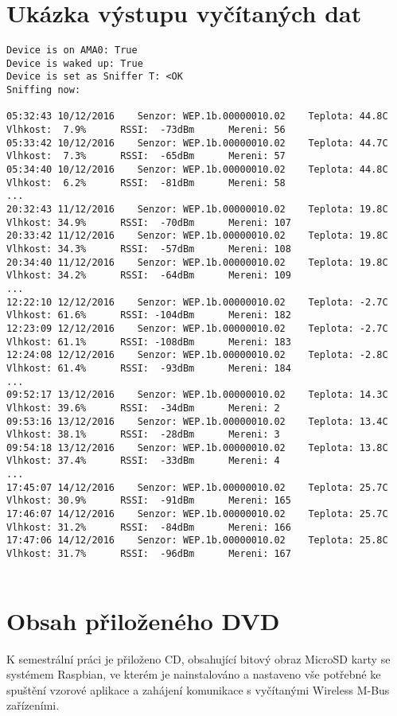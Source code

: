\chapter{Ukázka výstupu vyčítaných dat}
\label{PrilohaVystup}
	\begin{lstlisting}[style=MyCodeBash]
Device is on AMA0: True
Device is waked up: True
Device is set as Sniffer T: <OK
Sniffing now:

05:32:43 10/12/2016    Senzor: WEP.1b.00000010.02    Teplota: 44.8C    Vlhkost:  7.9%      RSSI:  -73dBm      Mereni: 56
05:33:42 10/12/2016    Senzor: WEP.1b.00000010.02    Teplota: 44.7C    Vlhkost:  7.3%      RSSI:  -65dBm      Mereni: 57
05:34:40 10/12/2016    Senzor: WEP.1b.00000010.02    Teplota: 44.8C    Vlhkost:  6.2%      RSSI:  -81dBm      Mereni: 58
...
20:32:43 11/12/2016    Senzor: WEP.1b.00000010.02    Teplota: 19.8C    Vlhkost: 34.9%      RSSI:  -70dBm      Mereni: 107
20:33:42 11/12/2016    Senzor: WEP.1b.00000010.02    Teplota: 19.8C    Vlhkost: 34.3%      RSSI:  -57dBm      Mereni: 108
20:34:40 11/12/2016    Senzor: WEP.1b.00000010.02    Teplota: 19.8C    Vlhkost: 34.2%      RSSI:  -64dBm      Mereni: 109
...
12:22:10 12/12/2016    Senzor: WEP.1b.00000010.02    Teplota: -2.7C    Vlhkost: 61.6%      RSSI: -104dBm      Mereni: 182
12:23:09 12/12/2016    Senzor: WEP.1b.00000010.02    Teplota: -2.7C    Vlhkost: 61.1%      RSSI: -108dBm      Mereni: 183 
12:24:08 12/12/2016    Senzor: WEP.1b.00000010.02    Teplota: -2.8C    Vlhkost: 61.4%      RSSI:  -93dBm      Mereni: 184
...
09:52:17 13/12/2016    Senzor: WEP.1b.00000010.02    Teplota: 14.3C    Vlhkost: 39.6%      RSSI:  -34dBm      Mereni: 2
09:53:16 13/12/2016    Senzor: WEP.1b.00000010.02    Teplota: 13.4C    Vlhkost: 38.1%      RSSI:  -28dBm      Mereni: 3 
09:54:18 13/12/2016    Senzor: WEP.1b.00000010.02    Teplota: 13.8C    Vlhkost: 37.4%      RSSI:  -33dBm      Mereni: 4
...
17:45:07 14/12/2016    Senzor: WEP.1b.00000010.02    Teplota: 25.7C    Vlhkost: 30.9%      RSSI:  -91dBm      Mereni: 165
17:46:07 14/12/2016    Senzor: WEP.1b.00000010.02    Teplota: 25.7C    Vlhkost: 31.2%      RSSI:  -84dBm      Mereni: 166
17:47:06 14/12/2016    Senzor: WEP.1b.00000010.02    Teplota: 25.8C    Vlhkost: 31.7%      RSSI:  -96dBm      Mereni: 167


	\end{lstlisting}

\chapter{Obsah přiloženého DVD}
K semestrální práci je přiloženo CD, obsahující bitový obraz MicroSD karty se systémem Raspbian, ve kterém je nainstalováno a nastaveno vše potřebné ke spuštění vzorové aplikace a zahájení komunikace s vyčítanými Wireless M-Bus zařízeními.
